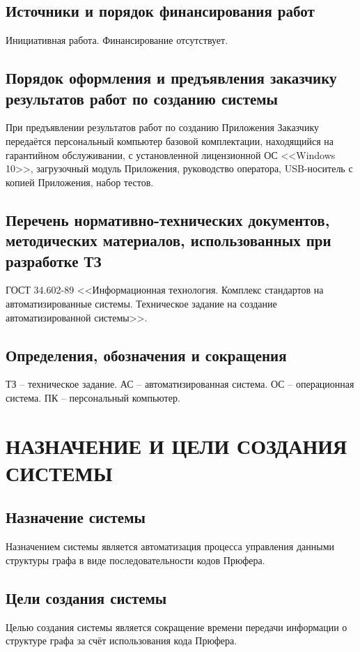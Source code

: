 \documentclass[12pt,a4paper]{article}
\begin{document}
\subsection{Источники и порядок финансирования работ}
Инициативная работа. Финансирование отсутствует.

\subsection{Порядок оформления и предъявления заказчику результатов работ по созданию системы}
При предъявлении результатов работ по созданию Приложения Заказчику передаётся персональный компьютер базовой 
комплектации, находящийся на гарантийном обслуживании, с установленной лицензионной ОС <<Windows 10>>, 
загрузочный модуль Приложения, руководство оператора, USB-носитель с копией Приложения, набор тестов.

\subsection{Перечень нормативно-технических документов, методических материалов, использованных при разработке ТЗ}
ГОСТ 34.602-89 <<Информационная технология. Комплекс стандартов на автоматизированные системы. Техническое задание
на создание автоматизированной системы>>.

\subsection{Определения, обозначения и сокращения}
ТЗ -- техническое задание. \medskip \newline
АС -- автоматизированная система. \medskip \newline
ОС -- операционная система.\medskip \newline
ПК -- персональный компьютер.

\newpage
\section{НАЗНАЧЕНИЕ И ЦЕЛИ СОЗДАНИЯ СИСТЕМЫ}
\subsection{Назначение системы}
Назначением системы является автоматизация процесса управления данными структуры графа в виде последовательности 
кодов Прюфера.

\subsection{Цели создания системы}
Целью создания системы является сокращение времени передачи информации о структуре графа за счёт использования 
кода Прюфера.
\end{document}
